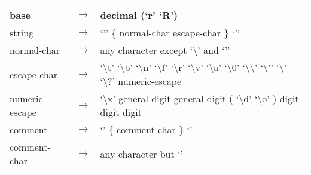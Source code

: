 \documentclass[letterpaper,10pt,english]{sphinxmanual}
\begin{document}
\begin{tabulary}{\linewidth}{|L|L|L|}
\\
\hline
base
&
\(\rightarrow\)
&
decimal (‘r’ \textbar{} ‘R’)
\\
\hline
string
&
\(\rightarrow\)
&
‘’’ \{ normal-char \textbar{} escape-char \} ‘’’
\\
\hline
normal-char
&
\(\rightarrow\)
&
any character except ‘\textbackslash{}’ and ‘’’
\\
\hline
escape-char
&
\(\rightarrow\)
&
‘\textbackslash{}t’ \textbar{} ‘\textbackslash{}b’ \textbar{} ‘\textbackslash{}n’ \textbar{} ‘\textbackslash{}f’ \textbar{} ‘\textbackslash{}r’ \textbar{} ‘\textbackslash{}v’ \textbar{} ‘\textbackslash{}a’ \textbar{} ‘\textbackslash{}0’ \textbar{} ‘\textbackslash{}\textbackslash{}’ \textbar{} ‘\textbackslash{}’’ \textbar{} ‘\textbackslash{}\sphinxquotedblright{}’ \textbar{} ‘\textbackslash{}?’ \textbar{} numeric-escape
\\
\hline
numeric-escape
&
\(\rightarrow\)
&
‘\textbackslash{}x’ general-digit general-digit \textbar{} ( ‘\textbackslash{}d’ \textbar{} ‘\textbackslash{}o’ ) digit digit digit
\\
\hline
comment
&
\(\rightarrow\)
&
‘\sphinxquotedblright{}’ \{ comment-char \} ‘\sphinxquotedblright{}’
\\
\hline
comment-char
&
\(\rightarrow\)
&
any character but ‘\sphinxquotedblright{}’
\\
\hline\end{tabulary}
\end{document}
